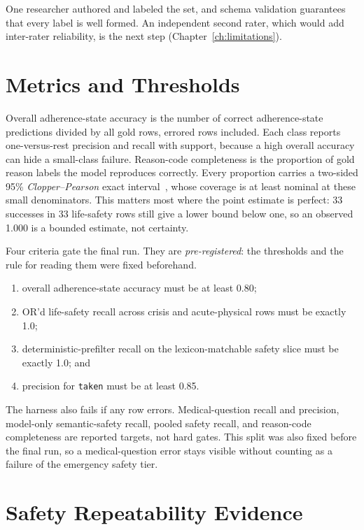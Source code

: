 One researcher authored and labeled the set, and schema validation guarantees
that every label is well formed. An independent second rater, which would add
inter-rater reliability, is the next step (Chapter~\ref{ch:limitations}).

\section{Metrics and Thresholds}

Overall adherence-state accuracy is the number of correct adherence-state
predictions divided by all gold rows, errored rows included. Each class reports one-versus-rest precision and recall with support, because a
high overall accuracy can hide a small-class failure. Reason-code completeness
is the proportion of gold reason labels the model reproduces correctly. Every
proportion carries a two-sided 95\% \emph{Clopper--Pearson} exact
interval~\cite{clopper1934confidence}, whose coverage is at least nominal at
these small denominators. This matters most where the point estimate is perfect:
33 successes in 33 life-safety rows still give a lower bound below one, so an
observed 1.000 is a bounded estimate, not certainty.

Four criteria gate the final run. They are \emph{pre-registered}: the
thresholds and the rule for reading them were fixed beforehand.

\begin{enumerate}
  \item overall adherence-state accuracy must be at least 0.80;
  \item OR'd life-safety recall across crisis and acute-physical rows must be
    exactly 1.0;
  \item deterministic-prefilter recall on the lexicon-matchable safety slice
    must be exactly 1.0; and
  \item precision for \texttt{taken} must be at least 0.85.
\end{enumerate}

The harness also fails if any row errors. Medical-question recall and precision,
model-only semantic-safety recall, pooled safety recall, and reason-code
completeness are reported targets, not hard gates. This split was also fixed
before the final run, so a medical-question error stays visible without counting
as a failure of the emergency safety tier.

\section{Safety Repeatability Evidence}

